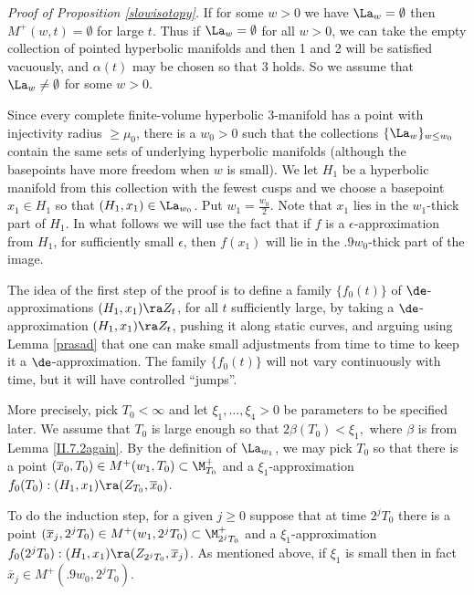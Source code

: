\bigskip
\noindent
{\em Proof of Proposition \ref{slowisotopy}.}
If for some $w>0$ we have $\La_w=\emptyset$ then
$M^+(w,t)=\emptyset$ for large $t$.  Thus if
$\La_w=\emptyset$ for all $w>0$,  we can take
the empty collection of pointed hyperbolic manifolds
and then 1 and 2 will be satisfied vacuously,
and $\alpha(t)$ may be chosen so that 3 holds.
So we assume that $\La_w\neq\emptyset$ for some $w>0$.

Since every complete finite-volume hyperbolic $3$-manifold
has a point with injectivity radius $\geq \mu_0$,
there is a $w_0>0$ such that the collections $\{\La_w\}_{w\leq w_0}$
contain the same sets of underlying hyperbolic manifolds
(although the basepoints have more freedom when $w$ is small).
We let $H_1$ be a hyperbolic manifold from this
collection with the fewest
cusps and we choose a basepoint $x_1\in H_1$ so that
$(H_1,x_1)\in \La_{w_0}$.   Put $w_1= \frac{w_0}{2}$.
Note that $x_1$ lies in the $w_1$-thick part of $H_1$.
In what follows we will use the fact that if $f$ is a
$\epsilon$-approximation from $H_1$, for sufficiently small
$\epsilon$, then $f(x_1)$ will lie in the $.9 w_0$-thick part of
the image.

The idea of the first step of the proof is to define a family $\{f_0(t)\}$
of $\de$-approximations $(H_1,x_1)\ra Z_t$,
for all $t$ sufficiently large, by taking
  a $\de$-approximation $(H_1,x_1)\ra Z_t$,
pushing it along static curves, and arguing using Lemma \ref{prasad}
that one can make small adjustments from time to time
to keep it a $\de$-approximation. The family $\{f_0(t)\}$
will not vary continuously with time, but it will have controlled
``jumps''.

More precisely, pick $T_0<\infty$ and let $\xi_1,\ldots,\xi_4>0$ be
parameters to be specified later.
We assume that $T_0$ is large enough so that
$
2\beta(T_0)<\xi_1,
$
where $\beta$ is from Lemma \ref{II.7.2again}.
By the definition of $\La_{w_1}$, we may pick $T_0$ so that there
is a point
$(\overline{x}_0,T_0)\in M^+(w_1,T_0)\subset\M_{T_0}^+$
and a $\xi_1$-approximation $f_0(T_0):(H_1,x_1)\ra (Z_{T_0},
\overline{x}_0)$.

To do the induction step, for a given $j \ge 0$ suppose that at time $2^j T_0$
there is a point
$(\overline{x}_j, 2^j T_0)\in M^+(w_1,2^j T_0)\subset\M_{2^j T_0}^+$
and a $\xi_1$-approximation $f_0(2^j T_0):(H_1,x_1)\ra
(Z_{2^j T_0},\overline{x}_j)$. As mentioned above, if
$\xi_1$ is small then in fact $\overline{x}_j \in M^+(.9 w_0,2^j T_0)$.

